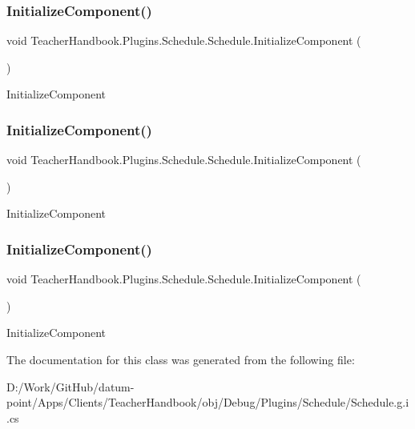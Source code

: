 \subsubsection{\texorpdfstring{Initialize\+Component()}{InitializeComponent()}\hspace{0.1cm}{\footnotesize\ttfamily [1/3]}}
{\footnotesize\ttfamily void Teacher\+Handbook.\+Plugins.\+Schedule.\+Schedule.\+Initialize\+Component (\begin{DoxyParamCaption}{ }\end{DoxyParamCaption})}



Initialize\+Component 

\mbox{\label{class_teacher_handbook_1_1_plugins_1_1_schedule_1_1_schedule_a4e0847c918304d0ce088671e13e8f9a6}} 
\subsubsection{\texorpdfstring{Initialize\+Component()}{InitializeComponent()}\hspace{0.1cm}{\footnotesize\ttfamily [2/3]}}
{\footnotesize\ttfamily void Teacher\+Handbook.\+Plugins.\+Schedule.\+Schedule.\+Initialize\+Component (\begin{DoxyParamCaption}{ }\end{DoxyParamCaption})}



Initialize\+Component 

\mbox{\label{class_teacher_handbook_1_1_plugins_1_1_schedule_1_1_schedule_a4e0847c918304d0ce088671e13e8f9a6}} 
\subsubsection{\texorpdfstring{Initialize\+Component()}{InitializeComponent()}\hspace{0.1cm}{\footnotesize\ttfamily [3/3]}}
{\footnotesize\ttfamily void Teacher\+Handbook.\+Plugins.\+Schedule.\+Schedule.\+Initialize\+Component (\begin{DoxyParamCaption}{ }\end{DoxyParamCaption})}



Initialize\+Component 



The documentation for this class was generated from the following file\+:\begin{DoxyCompactItemize}
\item 
D\+:/\+Work/\+Git\+Hub/datum-\/point/\+Apps/\+Clients/\+Teacher\+Handbook/obj/\+Debug/\+Plugins/\+Schedule/Schedule.\+g.\+i.\+cs\end{DoxyCompactItemize}
